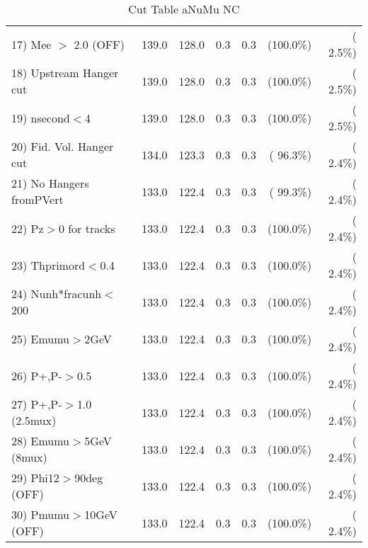 \begin{table}[h!]
\begin{tabular}{||l||r|r|r|r|r|r||}
 17) Mee $>$ 2.0  (OFF)   &        139.0 &        128.0 &          0.3 &          0.3 & (100.0\%) & (  2.5\%) \\
 18) Upstream Hanger cut  &        139.0 &        128.0 &          0.3 &          0.3 & (100.0\%) & (  2.5\%) \\
 19) nsecond$<$4          &        139.0 &        128.0 &          0.3 &          0.3 & (100.0\%) & (  2.5\%) \\
 20) Fid. Vol. Hanger cut &        134.0 &        123.3 &          0.3 &          0.3 & ( 96.3\%) & (  2.4\%) \\
 21) No Hangers fromPVert &        133.0 &        122.4 &          0.3 &          0.3 & ( 99.3\%) & (  2.4\%) \\
 22) Pz$>$0 for tracks    &        133.0 &        122.4 &          0.3 &          0.3 & (100.0\%) & (  2.4\%) \\
 23) Thprimord$<$0.4      &        133.0 &        122.4 &          0.3 &          0.3 & (100.0\%) & (  2.4\%) \\
 24) Nunh*fracunh$<$200   &        133.0 &        122.4 &          0.3 &          0.3 & (100.0\%) & (  2.4\%) \\
 25) Emumu$>$2GeV         &        133.0 &        122.4 &          0.3 &          0.3 & (100.0\%) & (  2.4\%) \\
 26) P+,P-$>$0.5          &        133.0 &        122.4 &          0.3 &          0.3 & (100.0\%) & (  2.4\%) \\
 27) P+,P-$>$1.0 (2.5mux) &        133.0 &        122.4 &          0.3 &          0.3 & (100.0\%) & (  2.4\%) \\
 28) Emumu$>$5GeV  (8mux) &        133.0 &        122.4 &          0.3 &          0.3 & (100.0\%) & (  2.4\%) \\
 29) Phi12$>$90deg  (OFF) &        133.0 &        122.4 &          0.3 &          0.3 & (100.0\%) & (  2.4\%) \\
 30) Pmumu$>$10GeV  (OFF) &        133.0 &        122.4 &          0.3 &          0.3 & (100.0\%) & (  2.4\%) \\
 \hline
 \hline
 \end{tabular}
 \caption{Cut Table  aNuMu NC }
 \label{tab-cutCohPi-}
 \end{table}
